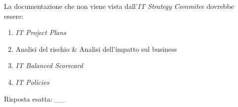 \begin{Exercise} [
  title={Quiz},
  label={esPG3}
  ]

  \Question La documentazione che non viene vista dall'\textit{IT Strategy 
Commitee} dovrebbe essere:
\begin{enumerate}
 \item \textit{IT Project Plans}
 \item Analisi del rischio \& Analisi dell'impatto sul business
 \item \textit{IT Balanced Scorecard}
 \item \textit{IT Policies}
\end{enumerate}

\end{Exercise}

\begin{Answer} [
  ref={esPG3},
  number={3}
  ]

  \Question Risposta esatta: \_\_%
\end{Answer}
